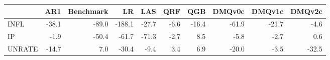 \begin{tabular}{lrrrrrrrrr}
\toprule
 & AR1 & Benchmark & LR & LAS & QRF & QGB & DMQv0c & DMQv1c & DMQv2c \\
\midrule
INFL & -38.1 & -89.0 & -188.1 & -27.7 & -6.6 & -16.4 & -61.9 & -21.7 & -4.6 \\
IP & -1.9 & -50.4 & -61.7 & -71.3 & -2.7 & 8.5 & -5.8 & -2.7 & 0.6 \\
UNRATE & -14.7 & 7.0 & -30.4 & -9.4 & 3.4 & 6.9 & -20.0 & -3.5 & -32.5 \\
\bottomrule
\end{tabular}
